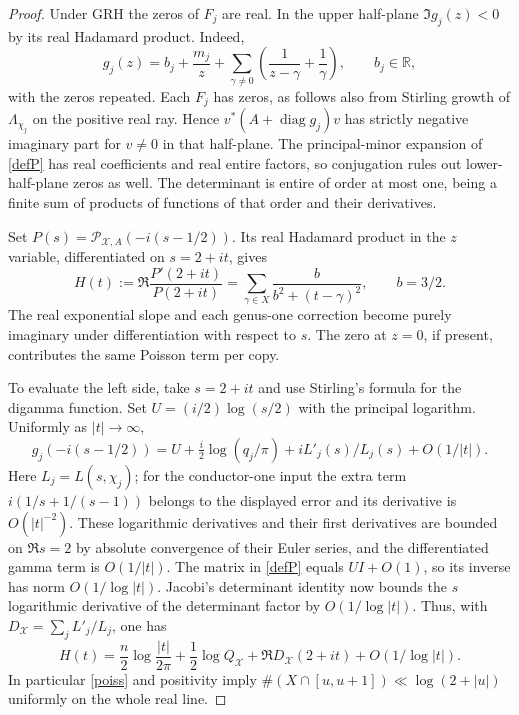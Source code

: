 \documentclass[11pt]{article}
\newcommand{\RR}{\mathbb R}
\newcommand{\diag}{\operatorname{diag}}
\newcommand{\cX}{\mathcal X}
\newcommand{\PP}{\mathcal P}
\begin{document}
\begin{proof}
Under GRH the zeros of $F_j$ are real. In the upper half-plane $\Im g_j(z)<0$ by its real Hadamard product. Indeed,
\[
 g_j(z)=b_j+\frac{m_j}{z}+\sum_{\gamma\ne0}
     \left(\frac1{z-\gamma}+\frac1\gamma\right),\qquad b_j\in\RR ,
\]
with the zeros repeated. Each $F_j$ has zeros, as follows also from Stirling growth of $\Lambda_{\chi_j}$ on the positive real ray. Hence $v^*(A+\diag g_j)v$ has strictly negative imaginary part for $v\ne0$ in that half-plane. The principal-minor expansion of \eqref{defP} has real coefficients and real entire factors, so conjugation rules out lower-half-plane zeros as well. The determinant is entire of order at most one, being a finite sum of products of functions of that order and their derivatives.

Set $P(s)=\PP_{\cX,A}(-i(s-1/2))$. Its real Hadamard product in the $z$ variable, differentiated on $s=2+it$, gives
\begin{equation}\label{poiss}
 H(t):=\Re \frac{P'(2+it)}{P(2+it)}
       =\sum_{\gamma\in X}\frac{b}{b^2+(t-\gamma)^2},\qquad b=3/2 .
\end{equation}
The real exponential slope and each genus-one correction become purely imaginary under differentiation with respect to $s$. The zero at $z=0$, if present, contributes the same Poisson term per copy.

To evaluate the left side, take $s=2+it$ and use Stirling's formula for the digamma function. Set $U=(i/2)\log(s/2)$ with the principal logarithm. Uniformly as $|t|\to\infty$,
\[
 g_j(-i(s-1/2))=U+\tfrac i2\log(q_j/\pi)+i L'_j(s)/L_j(s)+O(1/|t|).
\]
Here $L_j=L(s,\chi_j)$; for the conductor-one input the extra term $i(1/s+1/(s-1))$ belongs to the displayed error and its derivative is $O(|t|^{-2})$. These logarithmic derivatives and their first derivatives are bounded on $\Re s=2$ by absolute convergence of their Euler series, and the differentiated gamma term is $O(1/|t|)$. The matrix in \eqref{defP} equals $UI+O(1)$, so its inverse has norm $O(1/\log |t|)$. Jacobi's determinant identity now bounds the $s$ logarithmic derivative of the determinant factor by $O(1/\log |t|)$. Thus, with $D_{\cX}=\sum_j L'_j/L_j$, one has
\begin{equation}\label{cline}
 H(t)=\frac n2\log\frac{|t|}{2\pi}+\frac12\log Q_{\cX}
                 +\Re D_{\cX}(2+it)+O(1/\log |t|).
\end{equation}
In particular \eqref{poiss} and positivity imply $\#(X\cap[u,u+1])\ll\log(2+|u|)$ uniformly on the whole real line.


\end{proof}
\end{document}
